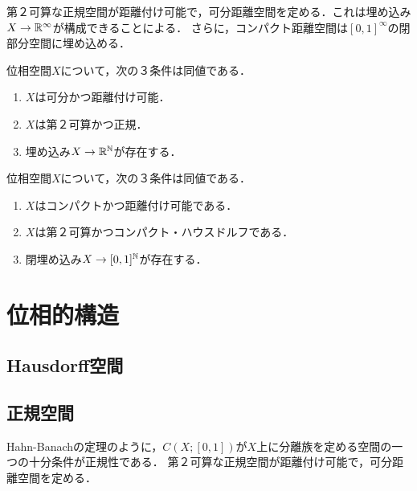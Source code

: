 \documentclass[uplatex,dvipdfmx]{jsreport}
\begin{document}
\begin{tcolorbox}[colframe=ForestGreen, colback=ForestGreen!10!white,breakable,colbacktitle=ForestGreen!40!white,coltitle=black,fonttitle=\bfseries\sffamily,
title=]
    第２可算な正規空間が距離付け可能で，可分距離空間を定める．これは埋め込み$X\to\mathbb{R}^\infty$が構成できることによる．
    さらに，コンパクト距離空間は$[0,1]^\infty$の閉部分空間に埋め込める．
\end{tcolorbox}

\begin{theorem}[Urysohnの距離付け定理]
    位相空間$X$について，次の３条件は同値である．
    \begin{enumerate}
        \item $X$は可分かつ距離付け可能．
        \item $X$は第２可算かつ正規．
        \item 埋め込み$X\to\mathbb{R}^{\mathbb{N}}$が存在する．
    \end{enumerate}
\end{theorem}

\begin{corollary}[AC, コンパクト距離空間は閉区間の可算積の閉部分空間と同相である]
    位相空間$X$について，次の３条件は同値である．
    \begin{enumerate}
        \item $X$はコンパクトかつ距離付け可能である．
        \item $X$は第２可算かつコンパクト・ハウスドルフである．
        \item 閉埋め込み$X\to[0,1]^{\mathbb{N}}$が存在する．
    \end{enumerate}
\end{corollary}


\chapter{位相的構造}

\section{Hausdorff空間}

\section{正規空間}

\begin{tcolorbox}[colframe=ForestGreen, colback=ForestGreen!10!white,breakable,colbacktitle=ForestGreen!40!white,coltitle=black,fonttitle=\bfseries\sffamily,
title=]
    Hahn-Banachの定理のように，$C(X;[0,1])$が$X$上に分離族を定める空間の一つの十分条件が正規性である．
    第２可算な正規空間が距離付け可能で，可分距離空間を定める．
\end{tcolorbox}
\end{document}
